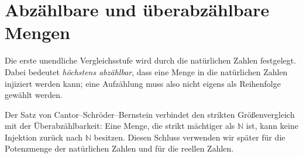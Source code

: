 \documentclass[main.tex]{subfiles}
\begin{document}
\section{Abzählbare und überabzählbare Mengen}

Die erste unendliche Vergleichsstufe wird durch die natürlichen Zahlen
festgelegt. Dabei bedeutet \emph{höchstens abzählbar}, dass eine Menge in
die natürlichen Zahlen injiziert werden kann; eine Aufzählung muss also
nicht eigens als Reihenfolge gewählt werden.





Der Satz von Cantor--Schröder--Bernstein verbindet den strikten
Größenvergleich mit der Überabzählbarkeit: Eine Menge, die strikt mächtiger
als \(\mathbb N\) ist, kann keine Injektion zurück nach \(\mathbb N\)
besitzen. Diesen Schluss verwenden wir später für die Potenzmenge der
natürlichen Zahlen und für die reellen Zahlen.

\begin{tabproofwide}
\end{tabproofwide}
\end{document}
